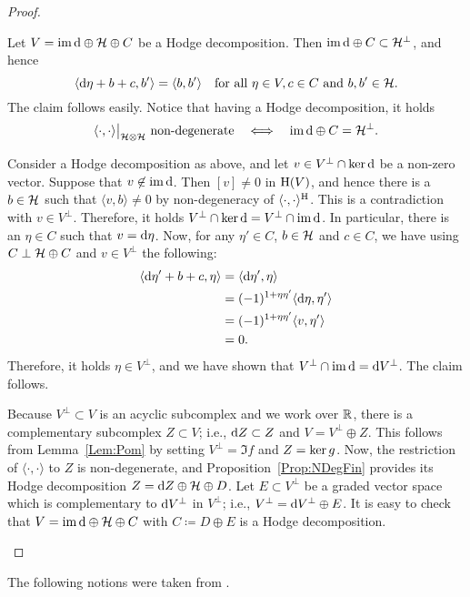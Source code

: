 \documentclass[\MainFolder/Text.tex]{subfiles}
\begin{document}
\begin{proof}
\begin{ProofList}
\item Let $V = \operatorname{im} \mathrm{d} \oplus \mathcal{H} \oplus C$ be a Hodge decomposition. Then $\operatorname{im} \mathrm{d} \oplus C \subset \mathcal{H}^\perp$, and hence
\[ \langle \mathrm{d} \eta + b + c, b' \rangle = \langle b,b'\rangle\quad\text{for all }\eta\in V, c\in C\text{ and }b, b'\in \mathcal{H}. \]
The claim follows easily. Notice that having a Hodge decomposition, it holds
\[ \Restr{\langle \cdot,\cdot\rangle}{\Harm\otimes \Harm}\text{ non-degenerate}\quad\Equiv\quad \Im\Dd \oplus C=\Harm^\perp. \] 
\item Consider a Hodge decomposition as above, and let $v\in V^\perp \cap \operatorname{ker} \mathrm{d}$ be a non-zero vector. Suppose that $v\not\in \operatorname{im}\mathrm{d}$. Then $[v] \neq 0$ in $\mathrm{H}(V)$, and hence there is a $b\in \mathcal{H}$ such that $\langle v,b \rangle \neq 0$ by non-degeneracy of $\langle\cdot,\cdot\rangle^{\mathrm{H}}$. This is a contradiction with $v\in V^\perp$. Therefore, it holds $V^\perp \cap \operatorname{ker} \mathrm{d} = V^\perp \cap \operatorname{im} \mathrm{d}$. In particular, there is an $\eta \in C$ such that $v = \mathrm{d} \eta$. Now, for any $\eta'\in C$, $b\in \mathcal{H}$ and $c\in C$, we have using $C\perp \mathcal{H}\oplus C$ and $v\in V^\perp$ the following:
\begin{align*}
\langle \mathrm{d} \eta' + b + c, \eta \rangle &= \langle \mathrm{d} \eta',\eta \rangle \\
&=(-1)^{1+\eta\eta'}\langle\mathrm{d}\eta,\eta'\rangle\\
&= (-1)^{1+\eta\eta'}\langle v,\eta'\rangle\\
&= 0.
\end{align*}
Therefore, it holds $\eta\in V^\perp$, and we have shown that $V^\perp \cap \operatorname{im}\mathrm{d} = \mathrm{d} V^\perp$. The claim follows.
\item Because $V^\perp \subset V$ is an acyclic subcomplex and we work over $\mathbb{R}$, there is a complementary subcomplex $Z\subset V$; i.e., $\mathrm{d} Z\subset Z$ and $V = V^\perp\oplus Z$. This follows from Lemma~\ref{Lem:Pom} by setting $V^\perp = \Im f$ and $Z=\operatorname{ker} g$. Now, the restriction of $\langle\cdot,\cdot\rangle$ to $Z$ is non-degenerate, and Proposition~\ref{Prop:NDegFin} provides its Hodge decomposition $Z=\mathrm{d} Z \oplus \mathcal{H} \oplus D$. Let $E\subset V^\perp$ be a graded vector space which is complementary to $\mathrm{d} V^\perp$ in $V^\perp$; i.e., $V^\perp = \mathrm{d} V^\perp \oplus E$. It is easy to check that $V=\operatorname{im}\mathrm{d}\oplus\mathcal{H}\oplus C$ with $C\coloneqq D \oplus E$ is a Hodge decomposition.
\qedhere
\end{ProofList}
\end{proof}
The following notions were taken from \cite{Van2019}.
\end{document}
